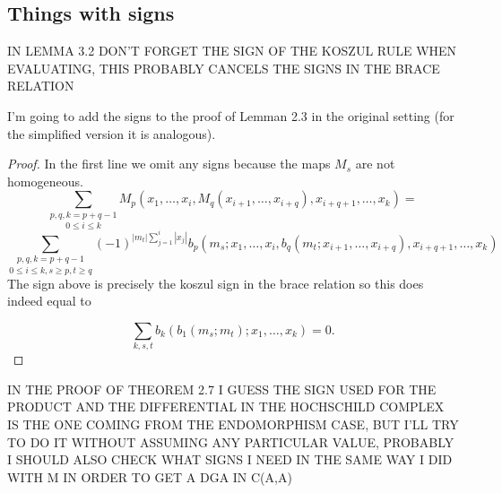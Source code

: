 \documentclass[twoside]{article}
\begin{document}
\subsection{Things with signs}
IN LEMMA 3.2 DON'T FORGET THE SIGN OF THE KOSZUL RULE WHEN EVALUATING, THIS PROBABLY CANCELS THE SIGNS IN THE BRACE RELATION

I'm going to add the signs to the proof of Lemman 2.3 in the original setting (for the simplified version it is analogous).

\begin{lemma}
\end{lemma}
\begin{proof}
In the first line we omit any signs because the maps $M_s$ are not homogeneous.
\[
\underset{0\leq i\leq k}{\sum_{p,q,k=p+q-1}}M_p(x_1,\dots, x_i, M_q(x_{i+1},\dots, x_{i+q}),x_{i+q+1},\dots, x_k)=
\]
\[
\underset{0\leq i\leq k, s\geq p,t\geq q}{\sum_{p,q,k=p+q-1}}(-1)^{|m_t|\sum_{j=1}^i|x_j|}b_p(m_s;x_1,\dots, x_i, b_q(m_t;x_{i+1},\dots, x_{i+q}),x_{i+q+1},\dots, x_k)
\]
The sign above is precisely the koszul sign in the brace relation so this does indeed equal to 

\[
\sum_{k,s,t}b_k(b_1(m_s;m_t);x_1,\dots, x_k)=0.
\]
\end{proof}

IN THE PROOF OF THEOREM 2.7 I GUESS THE SIGN USED FOR THE PRODUCT AND THE DIFFERENTIAL IN THE HOCHSCHILD COMPLEX IS THE ONE COMING FROM THE ENDOMORPHISM CASE, BUT I'LL TRY TO DO IT WITHOUT ASSUMING ANY PARTICULAR VALUE, PROBABLY I SHOULD ALSO CHECK WHAT SIGNS I NEED IN THE SAME WAY I DID WITH M IN ORDER TO GET A DGA IN C(A,A)
\end{document}
